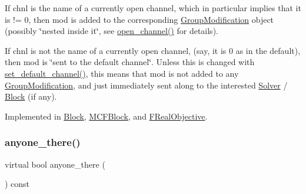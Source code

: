 \begin{DoxyItemize}
\item If chnl is the name of a currently open channel, which in particular implies that it is != 0, then mod is added to the corresponding \mbox{\hyperlink{class_s_m_spp__di__unipi__it_1_1_group_modification}{Group\+Modification}} object (possibly \char`\"{}nested inside it\char`\"{}, see \mbox{\hyperlink{class_s_m_spp__di__unipi__it_1_1_observer_acf7e46d450779f524e3655c5f31eecc8}{open\+\_\+channel()}} for details).
\item If chnl is not the name of a currently open channel, (say, it is 0 as in the default), then mod is \char`\"{}sent to the default channel\char`\"{}. Unless this is changed with \mbox{\hyperlink{class_s_m_spp__di__unipi__it_1_1_observer_a47f7642288d3e09ad9c792f86797840d}{set\+\_\+default\+\_\+channel()}}, this means that mod is not added to any \mbox{\hyperlink{class_s_m_spp__di__unipi__it_1_1_group_modification}{Group\+Modification}}, and just immediately sent along to the interested \mbox{\hyperlink{class_s_m_spp__di__unipi__it_1_1_solver}{Solver}} / \mbox{\hyperlink{class_s_m_spp__di__unipi__it_1_1_block}{Block}} (if any). 
\end{DoxyItemize}

Implemented in \mbox{\hyperlink{class_s_m_spp__di__unipi__it_1_1_block_a9b94536a10555dfb680e015fcb4787a8}{Block}}, \mbox{\hyperlink{class_s_m_spp__di__unipi__it_1_1_m_c_f_block_a2d7dffba0c9fd17de24549e0f1a4c760}{M\+C\+F\+Block}}, and \mbox{\hyperlink{class_s_m_spp__di__unipi__it_1_1_f_real_objective_a9b94536a10555dfb680e015fcb4787a8}{F\+Real\+Objective}}.

\mbox{\label{class_s_m_spp__di__unipi__it_1_1_observer_a7d8dd42bea99dfdb6fb967ba17993560}} 
\subsubsection{\texorpdfstring{anyone\+\_\+there()}{anyone\_there()}}
{\footnotesize\ttfamily virtual bool anyone\+\_\+there (\begin{DoxyParamCaption}\item[{void}]{ }\end{DoxyParamCaption}) const\hspace{0.3cm}{\ttfamily [pure virtual]}}



